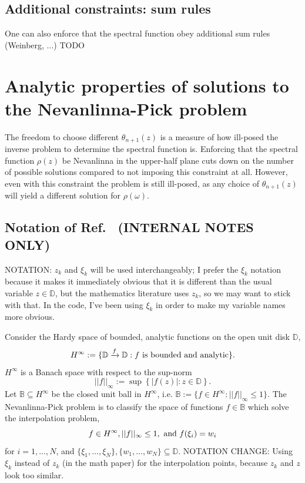 \subsection{Additional constraints: sum rules}

One can also enforce that the spectral function obey additional sum rules (Weinberg, ...) {\color{red}TODO}

\section{Analytic properties of solutions to the Nevanlinna-Pick problem}
\label{subsec:extremal}

The freedom to choose different $\theta_{n + 1}(z)$ is a measure of how ill-posed the inverse problem to determine the spectral function is. Enforcing that the spectral function $\rho(z)$ be Nevanlinna in the upper-half plane cuts down on the number of possible solutions compared to not imposing this constraint at all. However, even with this constraint the problem is still ill-posed, as any choice of $\theta_{n + 1}(z)$ will yield a different solution for $\rho(\omega)$. 

\subsection{Notation of Ref.~\cite{https://doi.org/10.48550/arxiv.1405.3578} (INTERNAL NOTES ONLY)}
\label{subsec:nev_pick_alg}

{\color{red}NOTATION: $z_k$ and $\xi_k$ will be used interchangeably; I prefer the $\xi_k$ notation because it makes it immediately obvious that it is different than the usual variable $z\in\mathbb D$, but the mathematics literature uses $z_k$, so we may want to stick with that. In the code, I've been using $\xi_k$ in order to make my variable names more obvious. }

Consider the Hardy space of bounded, analytic functions on the open unit disk $\mathbb D$, 
\begin{equation}
    H^\infty := \{ \mathbb D\xrightarrow{f} \mathbb D : f\textnormal{ is bounded and analytic}\}.
\end{equation}
$H^\infty$ is a Banach space with respect to the sup-norm
\begin{equation}
    ||f||_\infty := \sup \left\{|f(z)| : z\in\mathbb D \right\}.
\end{equation}
Let $\mathbb B\subseteq H^\infty$ be the closed unit ball in $H^\infty$, i.e. $\mathbb B := \{f\in H^\infty : ||f||_\infty\leq 1\}$. The Nevanlinna-Pick problem is to classify the space of functions $f\in\mathbb B$ which solve the interpolation problem,
\begin{equation}
    f\in H^\infty, ||f||_\infty\leq 1, \textnormal{ and } f(\xi_i) = w_i
    \label{eq:nevanlinna_problem}
\end{equation}
for $i = 1, ..., N$, and $\{\xi_1, ..., \xi_N\}, \{w_1, ..., w_N\}\subseteq\mathbb D$. {\color{red}NOTATION CHANGE: Using $\xi_k$ instead of $z_k$ (in the math paper) for the interpolation points, because $z_k$ and $z$ look too similar.}

